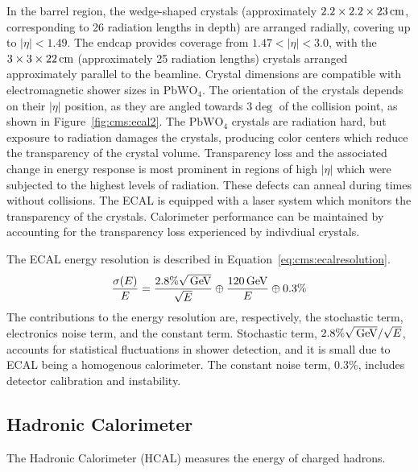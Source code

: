 

In the barrel region, the wedge-shaped crystals (approximately $2.2 \times 2.2 \times 23\,\text{cm}$, corresponding to 26 radiation lengths in depth) are arranged radially, covering up to $|\eta|<1.49$. The endcap provides coverage from $1.47<|\eta|<3.0$, with the $3\times 3\times 22\,\text{cm}$ (approximately 25 radiation lengths)  crystals arranged approximately parallel to the beamline. Crystal dimensions are compatible with electromagnetic shower sizes in $\mathrm{PbWO_4}$. The orientation of the crystals depends on their $|\eta|$ position, as they are angled towards $3\deg$ of the collision point, as shown in Figure~\ref{fig:cms:ecal2}.
 The $\mathrm{PbWO_4}$ crystals are radiation hard, but exposure to radiation damages the crystals, producing color centers which reduce the transparency of the crystal volume. Transparency loss and the associated change in energy response is most prominent in regions of high $|\eta|$ which were subjected to the highest levels of radiation\cite{Cipriani:2018ule}. These defects can anneal during times without collisions. The ECAL is equipped with a laser system which monitors the transparency of the crystals. Calorimeter performance can be maintained by accounting for the transparency loss experienced by indivdiual crystals\cite{CERN-LHCC-97-033}.   

The ECAL energy resolution is described in Equation~\ref{eq:cms:ecalresolution}. 
\begin{equation}
\frac{\sigma(E)}{E}=\frac{2.8\%\sqrt{\,\text{Ge\hspace{-.08em}V}}}{\sqrt{E}} \oplus \frac{120 \,\text{Ge\hspace{-.08em}V}}{E} \oplus 0.3\%
\label{eq:cms:ecalresolution}
\end{equation}
The contributions to the energy resolution are, respectively, the stochastic term, electronics noise term, and the constant term. Stochastic term, $2.8\%\sqrt{\,\text{Ge\hspace{-.08em}V}}/\sqrt{E}$, accounts for statistical fluctuations in shower detection, and it is small due to ECAL being a homogenous calorimeter. The constant noise term, $0.3\%$, includes detector calibration and instability\cite{Adzic:2007mi}.
\subsection{Hadronic Calorimeter}\label{ch:cms:hcal}
The Hadronic Calorimeter (HCAL) measures the energy of charged hadrons. 

